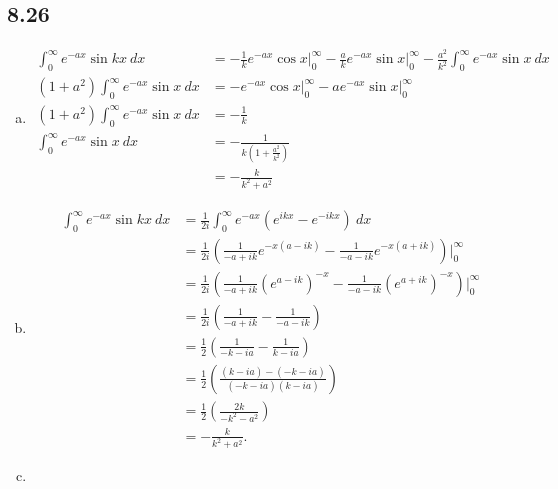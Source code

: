 \documentclass[10pt]{mypackage}
\begin{document}
\subsection{8.26}%
\begin{enumerate}[(a)]
  \item 
    \begin{align*}
      \int_{0}^{\infty} e^{-ax}\sin kx\:dx &= -\frac{1}{k}e^{-ax}\cos x\bigr\vert_{0}^{\infty} - \frac{a}{k}e^{-ax}\sin x\bigr\vert_{0}^{\infty} - \frac{a^2}{k^2}\int_{0}^{\infty} e^{-ax}\sin x\:dx\\
      \left(1 + a^2\right)\int_{0}^{\infty}e^{-ax} \sin x\:dx &= -e^{-ax}\cos x\bigr\vert_{0}^{\infty} - ae^{-ax}\sin x\bigr\vert_{0}^{\infty}\\
      \left(1 + a^2\right)\int_{0}^{\infty}e^{-ax} \sin x\:dx &= -\frac{1}{k}\\
      \int_{0}^{\infty} e^{-ax}\sin x\:dx &= -\frac{1}{k\left(1+\frac{a^2}{k^2}\right)}\\
                                          &= -\frac{k}{k^2 + a^2}
    \end{align*}
  \item 
    \begin{align*}
      \int_{0}^{\infty} e^{-ax}\sin kx\:dx &= \frac{1}{2i}\int_{0}^{\infty} e^{-ax}\left(e^{ikx} - e^{-ikx}\right)\:dx\\
                                           &= \frac{1}{2i}\left(\frac{1}{-a+ik}e^{-x\left(a-ik\right)} - \frac{1}{-a-ik}e^{-x\left(a + ik\right)}\right)\bigr\vert_{0}^{\infty}\\
                                           &= \frac{1}{2i}\left(\frac{1}{-a + ik}\left(e^{a-ik}\right)^{-x} - \frac{1}{-a-ik}\left(e^{a + ik}\right)^{-x}\right)\bigr\vert_{0}^{\infty}\\
                                           &= \frac{1}{2i}\left(\frac{1}{-a + ik} - \frac{1}{-a-ik}\right)\\
                                           &= \frac{1}{2}\left(\frac{1}{-k-ia} - \frac{1}{k - ia}\right)\\
                                           &= \frac{1}{2}\left(\frac{(k-ia)-\left(-k-ia\right)}{\left(-k-ia\right)\left(k-ia\right)}\right)\\
                                           &= \frac{1}{2}\left(\frac{2k}{-k^2 - a^2}\right)\\
                                           &= -\frac{k}{k^2 + a^2}.
    \end{align*}
  \item

\end{enumerate}
\end{document}
